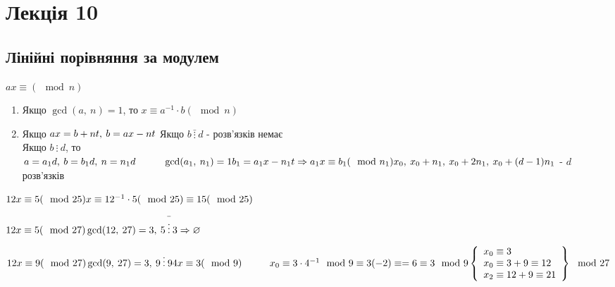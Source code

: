 \documentclass[a4paper,12pt, centered]{bookest}
\newcommand\tab[1][1cm]{\hspace*{#1}}
\begin{document}
\chapter{Лекція 10}
\section{Лінійні порівняння за модулем}
$ax\equiv(\mod n)$
\begin{enumerate}
	\item Якщо $\gcd(a,\>n)=1$, то $x\equiv a^{-1}\cdot b(\mod n)$
	\item Якщо $ax=b+nt,\>b=ax-nt\\$ Якщо $b\>\bar{\vdots}\>d$ - розв'язків немає\\ Якщо $b\>\vdots\>d$, то  $a=a_1d,\>b=b_1d,\>n=n_1d\tab \gcd(a_1,\>n_1)=1\\b_1=a_1x-n_1t\Rightarrow a_1x\equiv b_1(\mod n_1)\\x_0,\>x_0+n_1,\>x_0+2n_1,\>x_0+(d-1)n_1$ - $d$ розв'язків
\end{enumerate}
\begin{example}
	$12x\equiv 5(\mod 25)\\x\equiv 12^{-1}\cdot 5(\mod 25)\equiv 15(\mod 25)$
\end{example}
\begin{example}
	$12x\equiv5(\mod 27)\\\gcd(12,\>27)=3,\>5\>\bar{\vdots}\>3\Rightarrow \varnothing$
\end{example}
\begin{example}
	$12x\equiv 9(\mod 27)\\\gcd(9,\>27)=3,\>9\>\vdots\>9\\4x\equiv3(\mod 9)\tab x_0\equiv3\cdot4^{-1}\mod 9\equiv3(-2)\equiv=6\equiv 3\mod 9\\\left\{\begin{array}{l}
		x_0\equiv 3\\x_0\equiv3+9\equiv 12\\x_2\equiv12+9\equiv 21
	\end{array}\right\}\mod 27$
\end{example}
\end{document}

